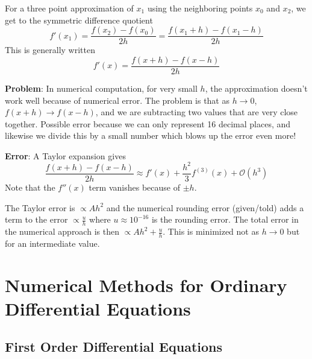 \documentclass[11pt, a4paper]{article}
\begin{document}
For a three point approximation of $ x_1 $ using the neighboring points $ x_0 $ and $ x_2 $, we get to the symmetric difference quotient
\begin{equation*}
	f'(x_1) = \frac{f(x_2) - f(x_0)}{2h} = \frac{f(x_1 + h) - f(x_1 - h)}{2h}
\end{equation*}
This is generally written 
\begin{equation*}
	f'(x) = \frac{f(x + h) - f(x-h)}{2h}
\end{equation*}

\textbf{Problem}: In numerical computation, for very small $ h $, the approximation doesn't work well because of numerical error. The problem is that as $ h \to 0 $, $ f(x + h) \to f(x-h) $, and we are subtracting two values that are very close together. Possible error because we can only represent 16 decimal places, and likewise we divide this by a small number which blows up the error even more!

\textbf{Error}: A Taylor expansion gives
\begin{equation*}
	\frac{f(x + h) - f(x-h)}{2h} \approx f'(x) + \frac{h^2}{3}f^{(3)}(x) + \mathcal{O}(h^3)
\end{equation*}
Note that the $ f''(x) $ term vanishes because of $ \pm h $.

The Taylor error is $ \propto A h^2 $ and the numerical rounding error (given/told) adds a term to the error $ \propto \frac{u}{h} $ where $ u \approx 10^{-16} $ is the rounding error. The total error in the numerical approach is then $ \propto Ah^2 + \frac{u}{h} $. This is minimized not as $ h \to 0 $ but for an intermediate value.

\newpage

\section{Numerical Methods for Ordinary Differential Equations}
\subsection{First Order Differential Equations}
\end{document}
